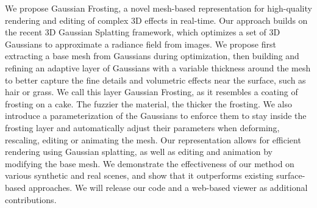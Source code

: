 We propose Gaussian Frosting, a novel mesh-based representation for high-quality rendering and editing of complex 3D effects in real-time. Our approach builds on the recent 3D Gaussian Splatting framework, which optimizes a set of 3D Gaussians to approximate a radiance field from images. We propose first extracting a base mesh from Gaussians during optimization, then building and refining an adaptive layer of Gaussians with a variable thickness around the mesh to better capture the fine details and volumetric effects near the surface, such as hair or grass. We call this layer Gaussian Frosting, as it resembles a coating of frosting on a cake. The fuzzier the material, the thicker the frosting. We also introduce a parameterization of the Gaussians to enforce them to stay inside the frosting layer and automatically adjust their parameters when deforming, rescaling, editing or animating the mesh. Our representation allows for efficient rendering using Gaussian splatting, as well as editing and animation by modifying the base mesh. We demonstrate the effectiveness of our method on various synthetic and real scenes, and show that it outperforms existing surface-based approaches. We will release our code and a web-based viewer as additional contributions.
  